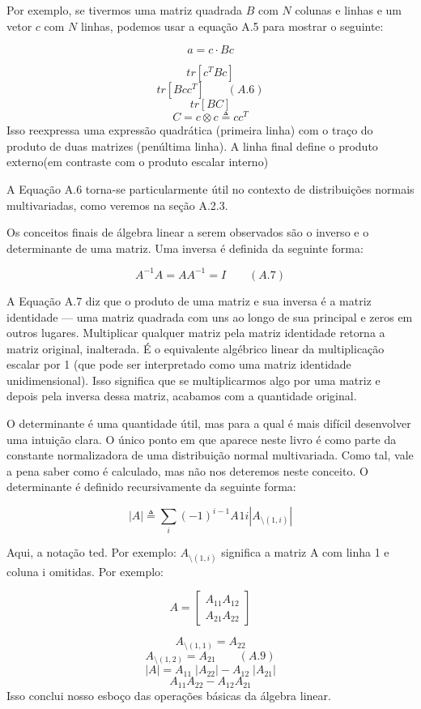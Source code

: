 \documentclass[
  12pt,
]{book}
\begin{document}
Por exemplo, se tivermos uma matriz quadrada \(B\) com \(N\) colunas e linhas e um vetor \(c\) com \(N\) linhas, podemos usar a equação A.5 para mostrar o seguinte:

\[ a = c \cdot Bc\]

\[ tr[c^T Bc] \]
\[ tr[Bcc^T] \qquad (A.6)\]
\[ tr[BC]\]
\[ C = c \otimes c \triangleq cc^T  \]
Isso reexpressa uma expressão quadrática (primeira linha) com o traço do produto de duas matrizes (penúltima linha). A linha final define o produto externo(em contraste com o produto escalar interno)

A Equação A.6 torna-se particularmente útil no contexto de distribuições normais multivariadas, como veremos na seção A.2.3.

Os conceitos finais de álgebra linear a serem observados são o inverso e o determinante de uma matriz. Uma inversa é definida da seguinte forma:

\[ A^{-1}A = AA^{-1} = I \qquad (A.7)\]

A Equação A.7 diz que o produto de uma matriz e sua inversa é a matriz identidade --- uma matriz quadrada com uns ao longo de sua principal e zeros em outros lugares. Multiplicar qualquer matriz pela matriz identidade retorna a matriz original, inalterada. É o equivalente algébrico linear da multiplicação escalar por 1 (que pode ser interpretado como uma matriz identidade unidimensional). Isso significa que se multiplicarmos algo por uma matriz e depois pela inversa dessa matriz, acabamos com a quantidade original.

O determinante é uma quantidade útil, mas para a qual é mais difícil desenvolver uma intuição clara. O único ponto em que aparece neste livro é como parte da constante normalizadora de uma distribuição normal multivariada. Como tal, vale a pena saber como é calculado, mas não nos deteremos neste conceito. O determinante é definido recursivamente da seguinte forma:

\[ |A| \triangleq \sum_i(-1)^{i-1}A_{}1i | A_{\setminus(1,i)} |  \]

Aqui, a notação ted. Por exemplo:
\(A_{\setminus(1, i)}\) significa a matriz A com linha 1 e coluna i omitidas. Por exemplo:

\[ A = 
\begin{bmatrix} 
  A_{11} A_{12} \\ 
  A_{21} A_{22} 
  \end{bmatrix}
  \]

\[ A_{\setminus(1,1)} = A_{22}\]
\[ A_{\setminus(1,2)} = A_{21} \qquad (A.9)\]
\[ |A| = A_{11} \; |A_{22}| -  A_{12} \;| A_{21}|\]
\[  A_{11}A_{22} - A_{12}A_{21} \]
Isso conclui nosso esboço das operações básicas da álgebra linear.
\end{document}
